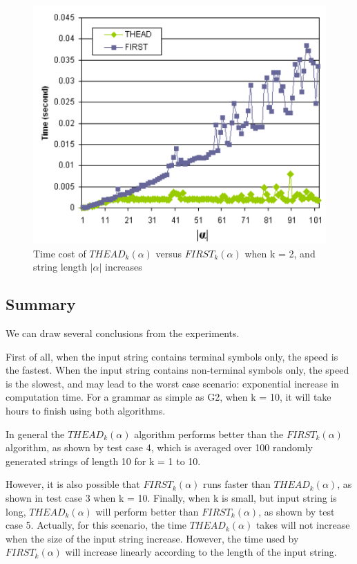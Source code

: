 \documentclass{sig-alternate-05-2015}
\begin{document}
\begin{figure}
\centering
\includegraphics[scale=0.5]{figure6.PNG}
\caption{Time cost of $THEAD_k(\alpha)$ versus $FIRST_k(\alpha)$
when k = 2, and string length $|\alpha|$ increases}
\label{fig:6}
\end{figure}

\subsection{Summary}
We can draw several conclusions from the experiments.

First of all, when the input string contains terminal symbols
only, the speed is the fastest. When the input string
contains non-terminal symbols only, the speed is the slowest,
and may lead to the worst case scenario: exponential
increase in computation time. For a grammar as simple as
G2, when k = 10, it will take hours to finish using both
algorithms.

In general the $THEAD_k(\alpha)$ algorithm performs better
than the $FIRST_k(\alpha)$ algorithm, as shown by test case 4,
which is averaged over 100 randomly generated strings of
length 10 for k = 1 to 10.

However, it is also possible that $FIRST_k(\alpha)$ runs faster
than $THEAD_k(\alpha)$, as shown in test case 3 when k = 10.
Finally, when k is small, but input string is long,
$THEAD_k(\alpha)$ will perform better than $FIRST_k(\alpha)$, as shown
by test case 5. Actually, for this scenario, the time
$THEAD_k(\alpha)$ takes will not increase when the size of the
input string increase. However, the time used by $FIRST_k(\alpha)$
will increase linearly according to the length of the input
string.
\end{document}
